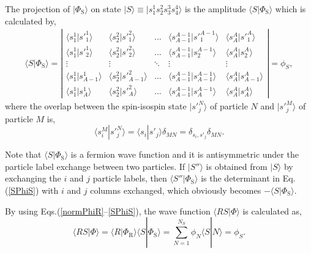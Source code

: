 \documentclass[12pt,letterpaper,UTF8]{report}
\begin{document}
The projection of $|\Phi_\textrm{S} \rangle $ on state $| S \rangle \equiv | s^1_1 s^2_2 s^3_3 s^4_4 \rangle$ is the amplitude $\langle S | \Phi_\textrm{S} \rangle$ which is calculated by,
\begin{align}
\langle S |\Phi_\textrm{S} \rangle =
\left |
\begin{array}{ccccc}
\langle s^1_1 | {s'}^1_1  \rangle & \langle s^2_2 | {s'}^2_1 \rangle & ... &  \langle s^{A-1}_{A-1} | {s'}^{A-1}_1 \rangle & \langle s^A_A| {s'}^A_1 \rangle  \\
\langle s^1_1 | {s'}_2^1  \rangle & \langle s^2_2 | {s'}^2_2 \rangle & ... & \langle s^{A-1}_{A-1} | s^{A-1}_2 \rangle & \langle s^A_A | s^A_2 \rangle  \\
\vdots & \vdots &  \ddots & \vdots & \vdots  \\
\langle s^1_1 | s^1_{A-1}  \rangle & \langle s^2_2 | {s'}^2_{A-1} \rangle & ... & \langle s^{A-1}_{A-1} | s^{A-1}_{A-1} \rangle & \langle s^A_A | s^A_{A-1} \rangle  \\
\langle s^1_1 | s^1_A  \rangle &\langle s^2_2 | {s'}^2_{A} \rangle & ... & \langle s^{A-1}_{A-1} | s^{A-1}_A \rangle & \langle s^A_A | s^A_A \rangle
\end{array}
\right |
= \phi_S,
\label{SPhiS}
\end{align}
where the overlap between the spin-isospin state $| {s'}^N_j  \rangle$ of particle $N$ and  $| {s'}^M_j  \rangle$ of particle $M$ is,
\begin{equation}
\langle s^M_i | {s'}^N_j  \rangle = \langle s_i | {s'}_j  \rangle \delta_{MN} = \delta_{s_i,{s'}_j} \delta_{MN} .
\end{equation}

Note that $\langle S | \Phi_\textrm{S} \rangle$ is a fermion wave function and it is antisymmetric under the particle label exchange between two particles. If $| S''  \rangle$ is obtained from $| S \rangle$ by exchanging the $i$ and $j$ particle labels, then $\langle S'' | \Phi_\textrm{S} \rangle$ is the determinant in Eq.(\ref{SPhiS}) with $i$ and $j$ columns exchanged, which obviously becomes $-\langle S | \Phi_\textrm{S} \rangle$.

By using Eqs.(\ref{normPhiR}--\ref{SPhiS}), the wave function $\langle RS | \Phi\rangle$ is calculated as,
\begin{equation}
\langle RS | \Phi\rangle
= \langle R | \Phi_\textrm{R} \rangle
\langle S | \Phi_\textrm{S} \rangle
=\sum_{N=1}^{N_S} \phi_N \langle S | N \rangle
=\phi_S. \label{RSPhi}
\end{equation}
\end{document}
